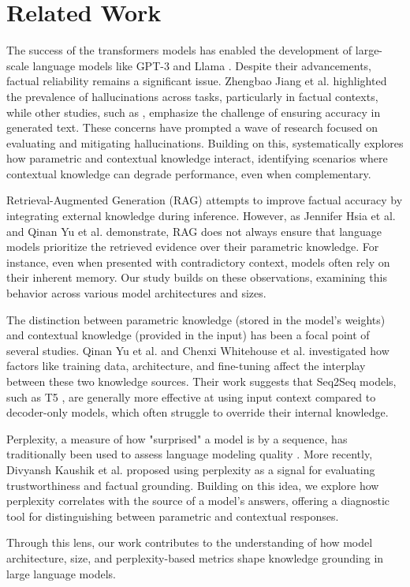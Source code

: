 \section{Related Work}

The success of the transformers models \cite{attention_is_all_you_need} has enabled the development of large-scale language models like GPT-3 \cite{gpt3} and Llama \cite{llama}.
Despite their advancements, factual reliability remains a significant issue.
Zhengbao Jiang et al.\cite{how_can_we_know} highlighted the prevalence of hallucinations across tasks, particularly in factual contexts, while other studies, such as \cite{can_rag_models_reason,gpt2}, emphasize the challenge of ensuring accuracy in generated text.
These concerns have prompted a wave of research focused on evaluating and mitigating hallucinations.
Building on this, \citeauthor{understanding_the_interplay} systematically explores how parametric and contextual knowledge interact, identifying scenarios where contextual knowledge can degrade performance, even when complementary.

Retrieval-Augmented Generation (RAG) \cite{rag,atlas_foundational,retro} attempts to improve factual accuracy by integrating external knowledge during inference.
However, as Jennifer Hsia et al.\cite{ragged} and Qinan Yu et al.\cite{factual_recall} demonstrate, RAG does not always ensure that language models prioritize the retrieved evidence over their parametric knowledge.
For instance, even when presented with contradictory context, models often rely on their inherent memory.
Our study builds on these observations, examining this behavior across various model architectures and sizes.

The distinction between parametric knowledge (stored in the model's weights) and contextual knowledge (provided in the input) has been a focal point of several studies.
Qinan Yu et al.\cite{factual_recall} and Chenxi Whitehouse et al.\cite{knowledge_grounding_retrieval_augmented} investigated how factors like training data, architecture, and fine-tuning affect the interplay between these two knowledge sources.
Their work suggests that Seq2Seq models, such as T5 \cite{t5,flant5}, are generally more effective at using input context compared to decoder-only models, which often struggle to override their internal knowledge.

Perplexity, a measure of how "surprised" a model is by a sequence, has traditionally been used to assess language modeling quality \cite{how_can_we_know}.
More recently, Divyansh Kaushik et al.\cite{learning_the_difference} proposed using perplexity as a signal for evaluating trustworthiness and factual grounding.
Building on this idea, we explore how perplexity correlates with the source of a model's answers, offering a diagnostic tool for distinguishing between parametric and contextual responses.

Through this lens, our work contributes to the understanding of how model architecture, size, and perplexity-based metrics shape knowledge grounding in large language models.

